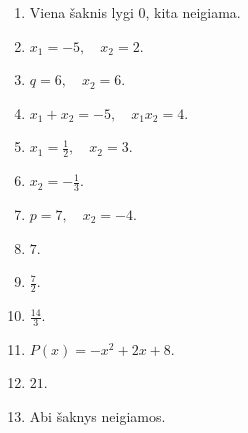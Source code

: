 \documentclass[11pt,a4paper]{article}
\begin{document}
\begin{enumerate}
\item Viena šaknis lygi \(0\), kita neigiama.
\item \(x_1=-5,\quad x_2=2\).
\item \(q=6,\quad x_2=6\).
\item \(x_1+x_2=-5,\quad x_1x_2=4\).
\item \(x_1=\frac{1}{2},\quad x_2=3\).
\item \(x_2=-\frac{1}{3}\).
\item \(p=7,\quad x_2=-4\).
\item \(7\).
\item \(\frac{7}{2}\).
\item \(\frac{14}{3}\).
\item \(P(x)=-x^2+2x+8\).
\item \(21\).
\item Abi šaknys neigiamos.
\end{enumerate}
\endgroup
\end{document}
